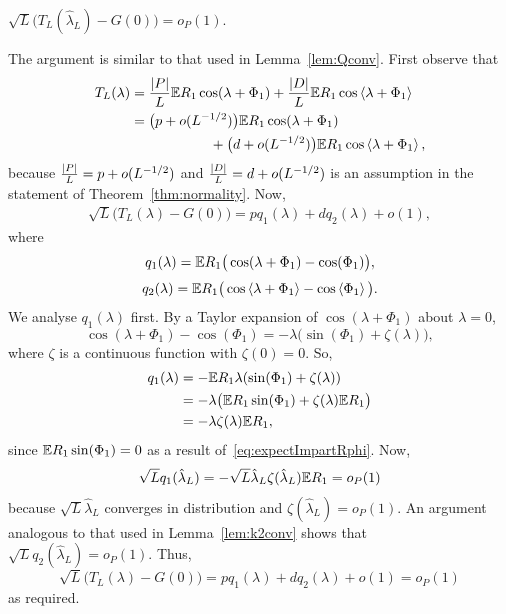 \documentclass[journal]{IEEEtran}
\begin{document}
\begin{lemma}\label{lem:HLtoG} $\sqrt{L}\big( T_L(\hat{\lambda}_L) - G(0) \big) = o_P(1)$.
\end{lemma}
\begin{IEEEproof}
The argument is similar to that used in Lemma~\ref{lem:Qconv}.  First observe that
\begin{align*}
T_L(\lambda) &= \frac{{\vert P \vert}}{L}{\mathbb E} R_1\cos(\lambda + \Phi_1) + \frac{{\vert D \vert}}{L} {\mathbb E} R_1\cos\left\langle \lambda + \Phi_1 \right\rangle \\
&=  \big( p + o(L^{-1/2}) \big) {\mathbb E} R_1\cos(\lambda + \Phi_1) \\
&\hspace{2cm} + \big( d + o(L^{-1/2}) \big) {\mathbb E} R_1\cos\left\langle \lambda + \Phi_1 \right\rangle,
\end{align*}
because $\tfrac{{\left\vert P \right\vert}}{L} = p + o(L^{-1/2})$ and $\tfrac{{\left\vert D \right\vert}}{L} = d + o(L^{-1/2})$ is an assumption in the statement of Theorem~\ref{thm:normality}.  Now,
\begin{align*}
\sqrt{L}\big( T_L(\lambda) - G(0) \big) = p q_1(\lambda) + d q_2(\lambda) + o(1),
\end{align*}
where
\[
q_1(\lambda) = {\mathbb E} R_1\big( \cos(\lambda + \Phi_1) - \cos(\Phi_1) \big),
\]
\begin{equation}
q_2(\lambda) = {\mathbb E} R_1\big( \cos\left\langle \lambda + \Phi_1 \right\rangle - \cos\left\langle \Phi_1 \right\rangle \big). \label{eq:q2def}
\end{equation}
We analyse $q_1(\lambda)$ first.  By a Taylor expansion of $\cos(\lambda + \Phi_1)$ about $\lambda = 0$,
\[
\cos(\lambda + \Phi_1) - \cos(\Phi_1) = -\lambda \big( \sin(\Phi_1) + \zeta(\lambda) \big),
\]
where $\zeta$ is a continuous function with $\zeta(0) = 0$. So,
\begin{align*}
q_1(\lambda) &= -{\mathbb E} R_1\lambda(\sin(\Phi_1) +  \zeta(\lambda)) \\
&= -\lambda \big( {\mathbb E} R_1\sin(\Phi_1) +  \zeta(\lambda) {\mathbb E} R_1 \big) \\
&= -\lambda \zeta(\lambda) {\mathbb E} R_1,
\end{align*}
since ${\mathbb E} R_1\sin(\Phi_1) = 0$ as a result of~\eqref{eq:expectImpartRphi}.  Now, 
\begin{align*}
\sqrt{L} q_1(\hat{\lambda}_L) = -\sqrt{L} \hat{\lambda}_L \zeta(\hat{\lambda}_L) {\mathbb E} R_1 = o_P(1)
\end{align*}
because $\sqrt{L} \hat{\lambda}_L$ converges in distribution and $\zeta(\hat{\lambda}_L) = o_P(1)$.  An argument analogous to that used in Lemma~\ref{lem:k2conv} shows that $\sqrt{L} q_2(\hat{\lambda}_L) = o_P(1)$.  Thus, 
\[
\sqrt{L}\big( T_L(\lambda) - G(0) \big) = p q_1(\lambda) + d q_2(\lambda) + o(1) = o_P(1)
\]
as required.
\end{IEEEproof}
\end{document}
